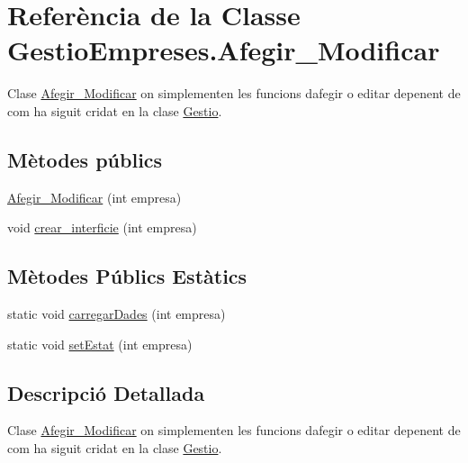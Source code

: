 \hypertarget{class_gestio_empreses_1_1_afegir___modificar}{}\section{Referència de la Classe Gestio\+Empreses.\+Afegir\+\_\+\+Modificar}
\label{class_gestio_empreses_1_1_afegir___modificar}


Clase \mbox{\hyperlink{class_gestio_empreses_1_1_afegir___modificar}{Afegir\+\_\+\+Modificar}} on s\textquotesingle{}implementen les funcions d\textquotesingle{}afegir o editar depenent de com ha siguit cridat en la clase \mbox{\hyperlink{class_gestio_empreses_1_1_gestio}{Gestio}}.  


\subsection*{Mètodes públics}
\begin{DoxyCompactItemize}
\item 
\mbox{\hyperlink{class_gestio_empreses_1_1_afegir___modificar_a5a9fe23eba7323eb0068cf645ab9db2e}{Afegir\+\_\+\+Modificar}} (int empresa)
\item 
void \mbox{\hyperlink{class_gestio_empreses_1_1_afegir___modificar_ad0541b1f19a81b372bbe41d5f34e3bdb}{crear\+\_\+interficie}} (int empresa)
\end{DoxyCompactItemize}
\subsection*{Mètodes Públics Estàtics}
\begin{DoxyCompactItemize}
\item 
static void \mbox{\hyperlink{class_gestio_empreses_1_1_afegir___modificar_a43a503c514d5e5c8a18f0c542ddf5e51}{carregar\+Dades}} (int empresa)
\item 
static void \mbox{\hyperlink{class_gestio_empreses_1_1_afegir___modificar_a73d48ab3748504cd141dae3ec8a7796d}{set\+Estat}} (int empresa)
\end{DoxyCompactItemize}


\subsection{Descripció Detallada}
Clase \mbox{\hyperlink{class_gestio_empreses_1_1_afegir___modificar}{Afegir\+\_\+\+Modificar}} on s\textquotesingle{}implementen les funcions d\textquotesingle{}afegir o editar depenent de com ha siguit cridat en la clase \mbox{\hyperlink{class_gestio_empreses_1_1_gestio}{Gestio}}. 

